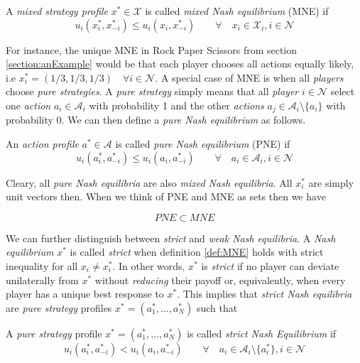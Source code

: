 \begin{definition}\label{def:MNE}
A \textit{mixed strategy profile} $x^* \in \mathcal{X}$ is called \textit{mixed Nash equilibrium} (MNE) if
    \[u_i(x_{i}^{*},x_{-i}^{*}) \le  u_i(x_{i},x_{-i}^{*}) \qquad \forall \quad x_i \in \mathcal{X}_i, i \in \mathcal{N}\]
\end{definition}

For instance, the unique MNE in Rock Paper Scissors from section \ref{section:anExample} would be that each player chooses all actions equally likely, i.e $x_{i}^{*} = (1/3,1/3,1/3) \quad \forall i \in \mathcal{N}$. A special case of MNE is when all \textit{players} choose \textit{pure strategies}. A \textit{pure strategy} simply means that all \textit{player} $i \in \mathcal{N}$ select one \textit{action} $a_i \in \mathcal{A}_i$ with probability 1 and the other \textit{actions} $a_j \in \mathcal{A}_i \setminus \{a_i\}$ with probability 0. We can then define a \textit{pure Nash equilibrium} as follows.

\begin{definition}\label{def:PNE}
    An \textit{action profile} $a^* \in \mathcal{A}$ is called \textit{pure Nash equilibrium} (PNE) if
    \[u_i(a_{i}^{*},a_{-i}^{*}) \le u_i(a_{i},a_{-i}^{*}) \qquad \forall \quad a_i \in \mathcal{A}_i, i \in \mathcal{N}\]
\end{definition}

Cleary, all \textit{pure Nash equilibria} are also \textit{mixed Nash equilibria}. All $x_{i}^{*}$ are simply unit vectors then. When we think of PNE and MNE as sets then we have 

\begin{equation*}
    PNE \subset MNE
\end{equation*}

We can further distinguish between \textit{strict} and \textit{weak Nash equilibria}. A \textit{Nash equilibrium} $x^*$ is called \textit{strict} when definition \ref{def:MNE} holds with strict inequality for all $x_i \neq x_{i}^{*}$. In other words, $x^*$ is \textit{strict} if no player can deviate unilaterally from $x^*$ without \textit{reducing} their payoff or, equivalently, when every player has a unique best response to $x^*$. This implies that \textit{strict Nash equilibria} are \textit{pure strategy} profiles $x^* = (a_{1}^{*},\dots,a_{N}^{*})$ such that

\begin{definition}\label{def:strictNE}
    A \textit{pure strategy} profile $x^* = (a_{1}^{*},\dots,a_{N}^{*})$ is called \textit{strict Nash Equilibrium} if
    \[u_i(a_{i}^{*},a_{-i}^{*}) < u_i(a_{i},a_{-i}^{*}) \qquad \forall \quad a_i \in \mathcal{A}_i \setminus \{a_{i}^{*}\} , i \in \mathcal{N}\]
\end{definition}

